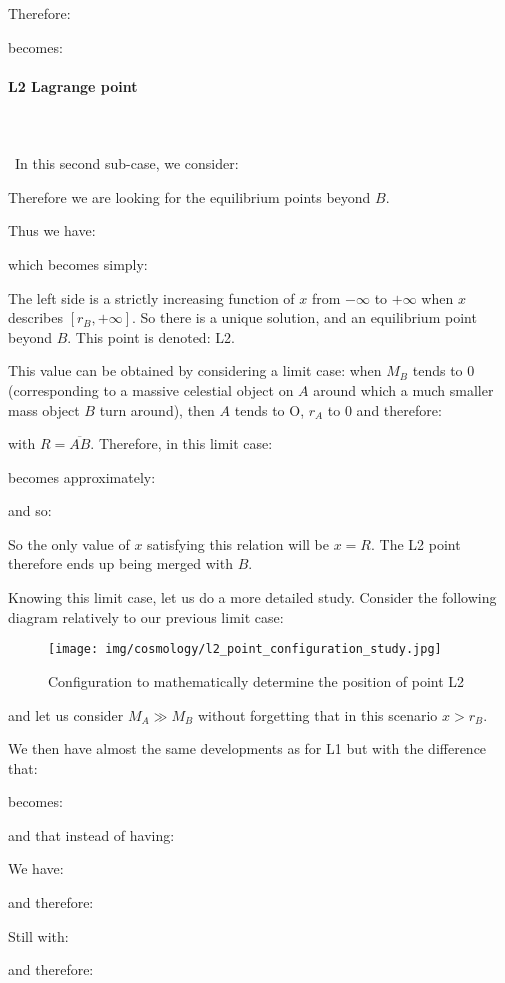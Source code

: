 	Therefore:
	
	becomes:
	
	
	\paragraph{L2 Lagrange point}\mbox{}\\\\\
	In this second sub-case, we consider:
	
	Therefore we are looking for the equilibrium points beyond $B$.

	Thus we have:
	
	which becomes simply:
	
	The left side is a strictly increasing function of $x$ from $-\infty$ to $+\infty$ when $x$ describes $[r_B,+\infty]$. So there is a unique solution, and an equilibrium point beyond $B$. This point is denoted: L2.

	This value can be obtained by considering a limit case: when $M_B$ tends to $0$ (corresponding to a massive celestial object on $A$ around which a much smaller mass object $B$ turn around), then $A$ tends to O, $r_A$ to $0$ and therefore:
	
	with $R=\overline{AB}$. Therefore, in this limit case:
	
	becomes approximately:
	
	and so:
	
	So the only value of $x$ satisfying this relation will be $x=R$. The L2 point therefore ends up being merged with $B$.

	Knowing this limit case, let us do a more detailed study. Consider the following diagram relatively to our previous limit case:
	\begin{figure}[H]
		\centering
		\texttt{[image: img/cosmology/l2\_point\_configuration\_study.jpg]}	
		\caption[]{Configuration to mathematically determine the position of point L2}
	\end{figure}
	and let us consider $M_A\gg M_B$ without forgetting that in this scenario $x>r_B$.

	We then have almost the same developments as for L1 but with the difference that:
	
	becomes:
	
	and that instead of having:
	
	We have:
	
	and therefore:
	
	Still with:
	
	and therefore:
	
